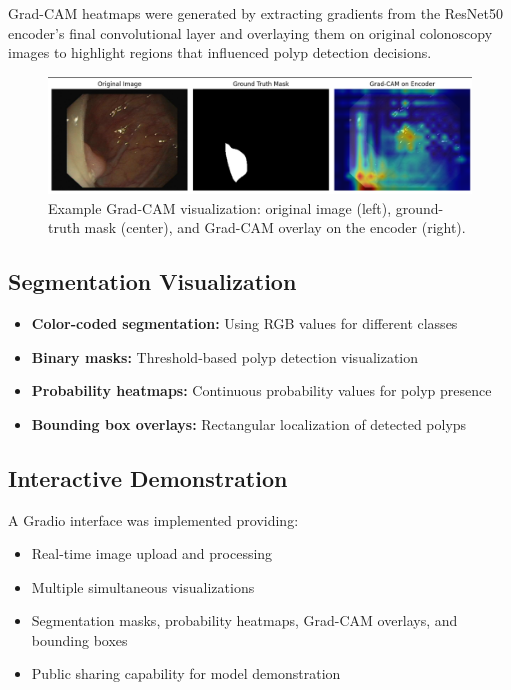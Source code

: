 \documentclass[a4paper,12pt]{report}
\begin{document}
Grad-CAM heatmaps were generated by extracting gradients from the ResNet50 encoder's final convolutional layer and overlaying them on original colonoscopy images to highlight regions that influenced polyp detection decisions.

\begin{figure}[h]
\centering
\includegraphics[width=\textwidth]{grad_cam.png}
\caption{Example Grad-CAM visualization: original image (left), ground-truth mask (center), and Grad-CAM overlay on the encoder (right).}
\label{fig:gradcam_example}
\end{figure}

\vspace{1em}

\subsection{Segmentation Visualization}

\begin{itemize}
\item \textbf{Color-coded segmentation:} Using RGB values for different classes
\item \textbf{Binary masks:} Threshold-based polyp detection visualization
\item \textbf{Probability heatmaps:} Continuous probability values for polyp presence
\item \textbf{Bounding box overlays:} Rectangular localization of detected polyps
\end{itemize}

\vspace{1em}

\subsection{Interactive Demonstration}

A Gradio interface was implemented providing:
\begin{itemize}
    \item Real-time image upload and processing
    \item Multiple simultaneous visualizations
    \item Segmentation masks, probability heatmaps, Grad-CAM overlays, and bounding boxes
    \item Public sharing capability for model demonstration
\end{itemize}
\end{document}
